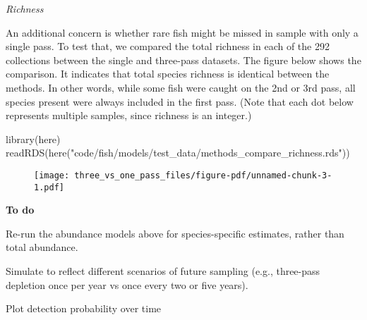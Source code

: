 \documentclass[
  letterpaper,
  DIV=11,
  numbers=noendperiod]{scrartcl}
\newenvironment{Shaded}{\begin{snugshade}}{\end{snugshade}}
\newcommand{\FunctionTok}[1]{\textcolor[rgb]{0.28,0.35,0.67}{#1}}
\newcommand{\NormalTok}[1]{\textcolor[rgb]{0.00,0.23,0.31}{#1}}
\newcommand{\StringTok}[1]{\textcolor[rgb]{0.13,0.47,0.30}{#1}}
\begin{document}
\emph{Richness}

An additional concern is whether rare fish might be missed in sample
with only a single pass. To test that, we compared the total richness in
each of the 292 collections between the single and three-pass datasets.
The figure below shows the comparison. It indicates that total species
richness is identical between the methods. In other words, while some
fish were caught on the 2nd or 3rd pass, all species present were always
included in the first pass. (Note that each dot below represents
multiple samples, since richness is an integer.)

\begin{Shaded}
\begin{Highlighting}[]
\FunctionTok{library}\NormalTok{(here)}
\FunctionTok{readRDS}\NormalTok{(}\FunctionTok{here}\NormalTok{(}\StringTok{"code/fish/models/test\_data/methods\_compare\_richness.rds"}\NormalTok{))}
\end{Highlighting}
\end{Shaded}

\begin{figure}[H]

{\centering \texttt{[image: three\_vs\_one\_pass\_files/figure-pdf/unnamed-chunk-3-1.pdf]}

}

\end{figure}

\textbf{To do}

Re-run the abundance models above for species-specific estimates, rather
than total abundance.

Simulate to reflect different scenarios of future sampling (e.g.,
three-pass depletion once per year vs once every two or five years).

Plot detection probability over time
\end{document}
